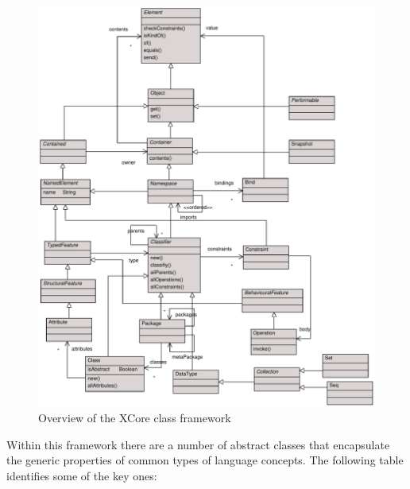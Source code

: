 \begin{figure}[htb]
\begin{center}
\includegraphics[width=15cm]{XMF/figures/xcore}
\caption{Overview of the XCore class framework}
\label{xmfframework}
\end{center}
\end{figure}

Within this framework there are a number of abstract classes that
encapsulate the generic properties of common types of language
concepts. The following table identifies some of the key ones:

